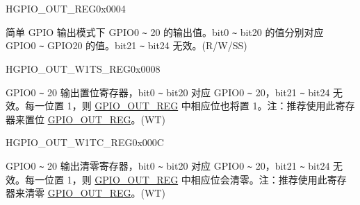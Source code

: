 

\begin{register}{H}{GPIO\_OUT\_REG}{0x0004}\label{regdesc:GPIOOUTREG}
%
%
\regnewline%
\begin{regdesc}\begin{reglist}
\label{fielddesc:GPIOOUTDATAORIG}\item [GPIO\_OUT\_DATA\_ORIG] 简单 GPIO 输出模式下 GPIO0 \verb+~+ 20 的输出值。bit0 \verb+~+ bit20 的值分别对应 GPIO0 \verb+~+ GPIO20 的值。bit21 \verb+~+ bit24 无效。(R/W/SS)
\end{reglist}\end{regdesc}
\end{register}


\begin{register}{H}{GPIO\_OUT\_W1TS\_REG}{0x0008}\label{regdesc:GPIOOUTW1TSREG}
%
%
\regnewline%
\begin{regdesc}\begin{reglist}
\label{fielddesc:GPIOOUTW1TS}\item [GPIO\_OUT\_W1TS] GPIO0 \verb+~+ 20 输出置位寄存器，bit0 \verb+~+ bit20 对应 GPIO0 \verb+~+ 20，bit21 \verb+~+ bit24 无效。每一位置 1，则 \hyperref[regdesc:GPIOOUTREG]{GPIO\_OUT\_REG} 中相应位也将置 1。注：推荐使用此寄存器来置位 \hyperref[regdesc:GPIOOUTREG]{GPIO\_OUT\_REG}。(WT)
\end{reglist}\end{regdesc}
\end{register}

\begin{register}{H}{GPIO\_OUT\_W1TC\_REG}{0x000C}\label{regdesc:GPIOOUTW1TCREG}
%
%
\regnewline%
\begin{regdesc}\begin{reglist}
\label{fielddesc:GPIOOUTW1TC}\item [GPIO\_OUT\_W1TC] GPIO0 \verb+~+ 20 输出清零寄存器，bit0 \verb+~+ bit20 对应 GPIO0 \verb+~+ 20，bit21 \verb+~+ bit24 无效。每一位置 1，则 \hyperref[regdesc:GPIOOUTREG]{GPIO\_OUT\_REG} 中相应位会清零。注：推荐使用此寄存器来清零 \hyperref[regdesc:GPIOOUTREG]{GPIO\_OUT\_REG}。(WT)
\end{reglist}\end{regdesc}
\end{register}


